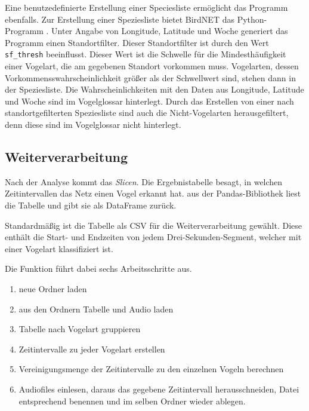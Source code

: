 Eine benutzedefinierte Erstellung einer Speciesliste ermöglicht das Programm ebenfalls.
Zur Erstellung einer Speziesliste bietet BirdNET das Python-Programm . Unter Angabe von Longitude, Latitude und Woche generiert das Programm einen Standortfilter. Dieser Standortfilter ist durch den Wert  \texttt{sf\_thresh} beeinflusst. Dieser Wert ist die Schwelle für die Mindesthäufigkeit einer Vogelart, die am gegebenen Standort vorkommen muss. Vogelarten, dessen Vorkommensswahrscheinlichkeit größer als der Schwellwert sind, stehen dann in der Speziesliste. 
Die Wahrscheinlichkeiten mit den Daten aus Longitude, Latitude und Woche sind im Vogelglossar hinterlegt. Durch das Erstellen von einer nach standortgefilterten Speziesliste sind auch die Nicht-Vogelarten herausgefiltert, denn diese sind im Vogelglossar nicht hinterlegt.





\subsection{Weiterverarbeitung}

Nach der Analyse kommt das \textit{Slicen}. Die Ergebnistabelle besagt, in welchen Zeitintervallen das Netz einen Vogel erkannt hat.  aus der Pandas-Bibliothek %
liest die Tabelle und gibt sie als DataFrame zurück.

Standardmäßig ist die Tabelle als CSV für die Weiterverarbeitung gewählt. Diese enthält die Start- und Endzeiten von jedem Drei-Sekunden-Segment, welcher mit einer Vogelart klassifiziert ist.

Die Funktion  führt dabei sechs Arbeitsschritte aus.  %


\begin{enumerate}
    \item\label{item-2:schritt0} neue Ordner laden
    \item aus den Ordnern Tabelle und Audio laden
    \item Tabelle nach Vogelart gruppieren
    \item Zeitintervalle zu jeder Vogelart erstellen
    \item Vereinigungsmenge der Zeitintervalle zu den einzelnen Vogeln berechnen
    \item Audiofiles einlesen, daraus das gegebene Zeitintervall herausschneiden, Datei entsprechend benennen und im selben Ordner wieder ablegen. 
\end{enumerate}

